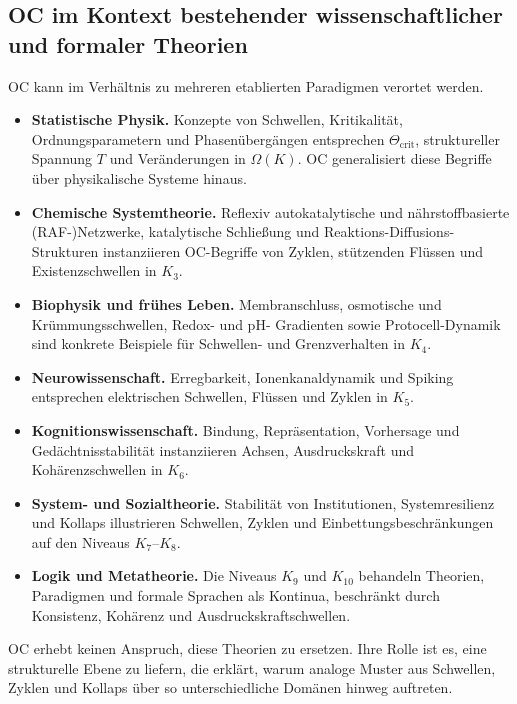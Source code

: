 \subsection{OC im Kontext bestehender wissenschaftlicher und formaler Theorien}

OC kann im Verhältnis zu mehreren etablierten Paradigmen verortet werden.

\begin{itemize}
    \item \textbf{Statistische Physik.}
          Konzepte von Schwellen, Kritikalität, Ordnungsparametern und
          Phasenübergängen entsprechen \(\Theta_{\mathrm{crit}}\), struktureller
          Spannung \(T\) und Veränderungen in \(\Omega(K)\).
          OC generalisiert diese Begriffe über physikalische Systeme hinaus.
    \item \textbf{Chemische Systemtheorie.}
          Reflexiv autokatalytische und nährstoffbasierte (RAF-)Netzwerke,
          katalytische Schließung und Reaktions-Diffusions-Strukturen
          instanziieren OC-Begriffe von Zyklen, stützenden Flüssen und
          Existenzschwellen in \(K_3\).
    \item \textbf{Biophysik und frühes Leben.}
          Membranschluss, osmotische und Krümmungsschwellen, Redox- und pH-
          Gradienten sowie Protocell-Dynamik sind konkrete Beispiele für
          Schwellen- und Grenzverhalten in \(K_4\).
    \item \textbf{Neurowissenschaft.}
          Erregbarkeit, Ionenkanaldynamik und Spiking entsprechen elektrischen
          Schwellen, Flüssen und Zyklen in \(K_5\).
    \item \textbf{Kognitionswissenschaft.}
          Bindung, Repräsentation, Vorhersage und Gedächtnisstabilität
          instanziieren Achsen, Ausdruckskraft und Kohärenzschwellen in \(K_6\).
    \item \textbf{System- und Sozialtheorie.}
          Stabilität von Institutionen, Systemresilienz und Kollaps illustrieren
          Schwellen, Zyklen und Einbettungsbeschränkungen auf den Niveaus
          \(K_7\)–\(K_8\).
    \item \textbf{Logik und Metatheorie.}
          Die Niveaus \(K_9\) und \(K_{10}\) behandeln Theorien, Paradigmen
          und formale Sprachen als Kontinua, beschränkt durch Konsistenz,
          Kohärenz und Ausdruckskraftschwellen.
\end{itemize}

OC erhebt keinen Anspruch, diese Theorien zu ersetzen.
Ihre Rolle ist es, eine strukturelle Ebene zu liefern, die erklärt, warum
analoge Muster aus Schwellen, Zyklen und Kollaps über so unterschiedliche
Domänen hinweg auftreten.

